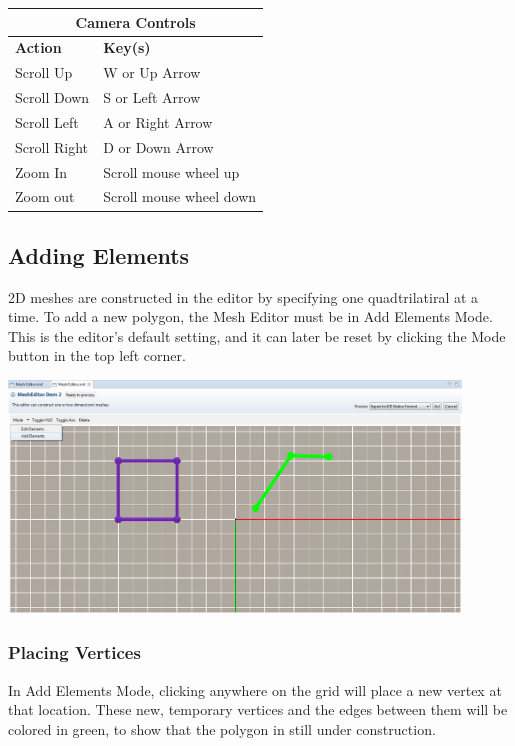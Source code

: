 \documentclass{article}
\begin{document}
\begin{center}
    \begin{tabular}{| l | l |}
    \hline
    \multicolumn{2}{|c|}{\textbf{Camera Controls}} \\
  	\hline
    \textbf{Action} & \textbf{Key(s)} \\ \hline
    Scroll Up & W or Up Arrow\\ \hline
    Scroll Down & S or Left Arrow\\ \hline
    Scroll Left & A or Right Arrow\\ \hline
    Scroll Right & D or Down Arrow\\ \hline
    Zoom In & Scroll mouse wheel up \\ \hline
    Zoom out & Scroll mouse wheel down \\
    \hline
    \end{tabular}
\end{center}

\subsection{Adding Elements}

2D meshes are constructed in the editor by specifying one quadtrilatiral at a
time. To add a new polygon, the Mesh Editor must be in Add Elements Mode. This
is the editor's default setting, and it can later be reset by clicking the Mode
button in the top left corner. 

\begin{center}
\includegraphics[width=12cm]{images/MeshEditorAddMode}
\end{center}

\subsubsection{Placing Vertices}

In Add Elements Mode, clicking anywhere on the grid will place a new vertex at
that location. These new, temporary vertices and the edges between them will be
colored in green, to show that the polygon in still under construction.
\end{document}
